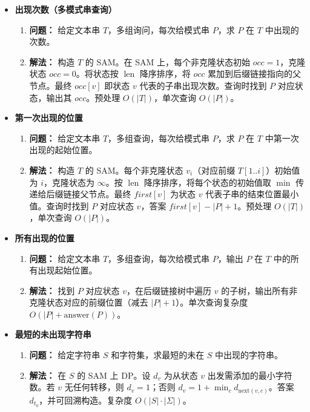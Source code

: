 \begin{itemize}
    \item \textbf{出现次数（多模式串查询）}
    \begin{enumerate}
        \item \textbf{问题：} 给定文本串 $T$，多组询问，每次给模式串 $P$，求 $P$ 在 $T$ 中出现的次数。
        \item \textbf{解法：} 构造 $T$ 的 SAM。在 SAM 上，每个非克隆状态初始 $occ=1$，克隆状态 $occ=0$。将状态按 $\operatorname{len}$ 降序排序，将 $occ$ 累加到后缀链接指向的父节点。最终 $occ[v]$ 即状态 $v$ 代表的子串出现次数。查询时找到 $P$ 对应状态，输出其 $occ$。预处理 $O(|T|)$，单次查询 $O(|P|)$。
    \end{enumerate}

    \item \textbf{第一次出现的位置}
    \begin{enumerate}
        \item \textbf{问题：} 给定文本串 $T$，多组查询，每次给模式串 $P$，求 $P$ 在 $T$ 中第一次出现的起始位置。
        \item \textbf{解法：} 构造 $T$ 的 SAM。每个非克隆状态 $v_i$（对应前缀 $T[1..i]$）初始值为 $i$，克隆状态为 $\infty$。按 $\operatorname{len}$ 降序排序，将每个状态的初始值取 $\min$ 传递给后缀链接父节点。最终 $first[v]$ 为状态 $v$ 代表子串的结束位置最小值。查询时找到 $P$ 对应状态 $v$，答案 $first[v] - |P| + 1$。预处理 $O(|T|)$，单次查询 $O(|P|)$。
    \end{enumerate}

    \item \textbf{所有出现的位置}
    \begin{enumerate}
        \item \textbf{问题：} 给定文本串 $T$，多组查询，每次给模式串 $P$，输出 $P$ 在 $T$ 中的所有出现起始位置。
        \item \textbf{解法：} 找到 $P$ 对应状态 $v$，在后缀链接树中遍历 $v$ 的子树，输出所有非克隆状态对应的前缀位置（减去 $|P|+1$）。单次查询复杂度 $O(|P| + \text{answer}(P))$。
    \end{enumerate}

    \item \textbf{最短的未出现字符串}
    \begin{enumerate}
        \item \textbf{问题：} 给定字符串 $S$ 和字符集，求最短的未在 $S$ 中出现的字符串。
        \item \textbf{解法：} 在 $S$ 的 SAM 上 DP。设 $d_v$ 为从状态 $v$ 出发需添加的最小字符数。若 $v$ 无任何转移，则 $d_v=1$；否则 $d_v=1+\min_{c} d_{\text{next}(v,c)}$。答案 $d_{t_0}$，并可回溯构造。复杂度 $O(|S|\cdot|\Sigma|)$。
    \end{enumerate}


\end{itemize}
